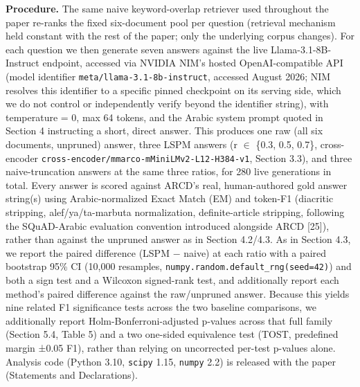 \documentclass[pdflatex,sn-basic,Numbered]{sn-jnl}
\begin{document}
\textbf{Procedure.} The same naive keyword-overlap retriever used throughout the paper re-ranks the fixed six-document pool per question (retrieval mechanism held constant with the rest of the paper; only the underlying corpus changes). For each question we then generate seven answers against the live Llama-3.1-8B-Instruct endpoint, accessed via NVIDIA NIM's hosted OpenAI-compatible API (model identifier \texttt{meta/llama-3.1-8b-instruct}, accessed August 2026; NIM resolves this identifier to a specific pinned checkpoint on its serving side, which we do not control or independently verify beyond the identifier string), with temperature = 0, max 64 tokens, and the Arabic system prompt quoted in Section 4 instructing a short, direct answer. This produces one raw (all six documents, unpruned) answer, three LSPM answers (r $\in$ \{0.3, 0.5, 0.7\}, cross-encoder \texttt{cross-encoder/mmarco-mMiniLMv2-L12-H384-v1}, Section 3.3), and three naive-truncation answers at the same three ratios, for 280 live generations in total. Every answer is scored against ARCD's real, human-authored gold answer string(s) using Arabic-normalized Exact Match (EM) and token-F1 (diacritic stripping, alef/ya/ta-marbuta normalization, definite-article stripping, following the SQuAD-Arabic evaluation convention introduced alongside ARCD [25]), rather than against the unpruned answer as in Section 4.2/4.3. As in Section 4.3, we report the paired difference (LSPM $-$ naive) at each ratio with a paired bootstrap 95\% CI (10,000 resamples, \texttt{numpy.random.default\_rng(seed=42)}) and both a sign test and a Wilcoxon signed-rank test, and additionally report each method's paired difference against the raw/unpruned answer. Because this yields nine related F1 significance tests across the two baseline comparisons, we additionally report Holm-Bonferroni-adjusted p-values across that full family (Section 5.4, Table 5) and a two one-sided equivalence test (TOST, predefined margin ±0.05 F1), rather than relying on uncorrected per-test p-values alone. Analysis code (Python 3.10, \texttt{scipy} 1.15, \texttt{numpy} 2.2) is released with the paper (Statements and Declarations).
\end{document}
